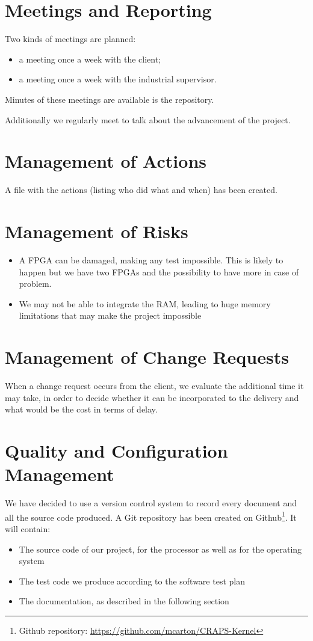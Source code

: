 \documentclass{article}
\begin{document}
  \section{Meetings and Reporting}
    Two kinds of meetings are planned:
    \begin{itemize}
        \item a meeting once a week with the client;
        \item a meeting once a week with the industrial supervisor.
    \end{itemize}
    Minutes of these meetings are available is the repository.

    Additionally we regularly meet to talk about the advancement of the project.

  \section{Management of Actions}
    A file with the actions (listing who did what and when) has been created.

  \section{Management of Risks}
    \begin{itemize}
      \item A FPGA can be damaged, making any test impossible. This is likely to
          happen but we have two FPGAs and the possibility to have more in case
          of problem.
      \item We may not be able to integrate the RAM, leading to huge memory
          limitations that may make the project impossible
    \end{itemize}

  \section{Management of Change Requests}
    When a change request occurs from the client, we evaluate the additional
    time it may take, in order to decide whether it can be incorporated to the
    delivery and what would be the cost in terms of delay.

  \section{Quality and Configuration Management}
    We have decided to use a version control system to record every document and
    all the source code produced. A Git repository has been created on
    Github\footnote{Github repository:
    \url{https://github.com/mcarton/CRAPS-Kernel}}.
    It will contain:
    \begin{itemize}
      \item The source code of our project, for the processor as well as for the
            operating system
      \item The test code we produce according to the software test plan
      \item The documentation, as described in the following section
    \end{itemize}
\end{document}
